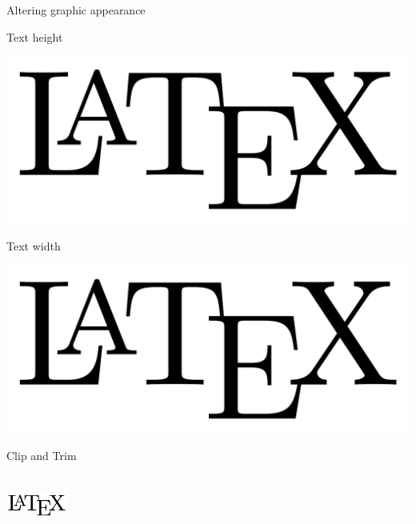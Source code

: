 \documentclass{article}
\begin{document}
Altering graphic appearance

Text height
\begin{center}
    \includegraphics[height=0.2\textheight]{LaTeX_logo.svg.png} %
\end{center}
Text width
\begin{center}
    \includegraphics[height=0.2\textwidth]{LaTeX_logo.svg.png}
\end{center}
Clip and Trim
\begin{center}
    \includegraphics[width=2cm, height=2cm, clip, trim = 0 0 50 50]{LaTeX_logo.svg.png}
\end{center}
\end{document}
